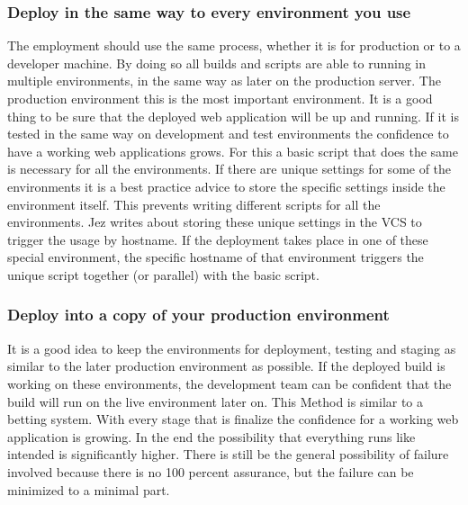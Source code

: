 \subsubsection{Deploy in the same way to every environment you use}
The employment should use the same process, whether it is for production or to a developer machine. By doing so all builds and scripts are able to
running in multiple environments, in the same way as later on the production server. The production environment this is the most important environment.
It is a good thing to be sure that the deployed web application will be up and running. If it is tested in the same way on development and test environments
the confidence to have a working web applications grows. For this a basic script that does the same is necessary for all the environments. If there are
unique settings for some of the environments it is a best practice advice to store the specific settings inside the environment itself. This prevents
writing different scripts for all the environments. Jez writes about storing these unique settings in the VCS to trigger the usage by hostname.
If the deployment takes place in one of these special environment, the specific hostname of that environment triggers the unique script together (or parallel)
with the basic script.

\subsubsection{Deploy into a copy of your production environment}
It is a good idea to keep the environments for deployment, testing and staging as similar to the later production environment as possible. If the deployed build
is working on these environments, the development team can be confident that the build will run on the live environment later on. This Method is similar to
a betting system. With every stage that is finalize the confidence for a working web application is growing. In the end the possibility that everything runs like
intended is significantly higher. There is still be the general possibility of failure involved because there is no 100 percent assurance, but the
failure can be minimized to a minimal part.

